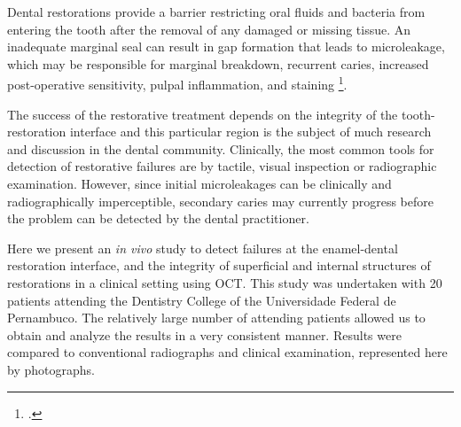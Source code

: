 \documentclass[12pt,twoside,english]{book}
\renewcommand{\~}{\perispomeni}%
\numberwithin{equation}{section}
\numberwithin{figure}{section}
\begin{document}

Dental restorations provide a barrier restricting oral fluids and bacteria from entering the tooth after the removal of any damaged or missing tissue. An inadequate marginal seal can result in gap formation that leads to microleakage, which may be responsible for marginal breakdown, recurrent caries, increased post-operative sensitivity, pulpal inflammation, and staining \footcite{Attar:2008p2147}.

The success of the restorative treatment depends on the integrity of the tooth-restoration interface and this particular region is the subject of much research and discussion in the dental community. Clinically, the most common tools for detection of restorative failures are by tactile, visual inspection or radiographic examination. However, since initial microleakages can be clinically and radiographically imperceptible, secondary caries may currently progress before the problem can be detected by the dental practitioner.

Here we present an \emph{in vivo} study to detect failures at the enamel-dental restoration interface, and the integrity of superficial and internal structures of restorations in a clinical setting using OCT. This study was undertaken with 20 patients attending the Dentistry College of the Universidade Federal de Pernambuco. The relatively large number of attending patients allowed us to obtain and analyze the results in a very consistent manner. Results were compared to conventional radiographs and clinical examination, represented here by photographs. 
\end{document}
